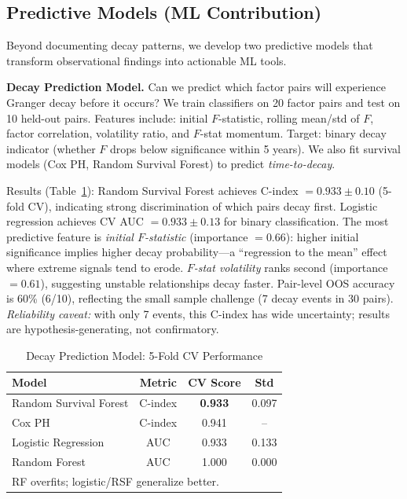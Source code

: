 \documentclass[sigconf,anonymous]{acmart}
\begin{document}
\subsection{Predictive Models (ML Contribution)}
\label{sec:prediction}

Beyond documenting decay patterns, we develop two predictive models
that transform observational findings into actionable ML tools.

\textbf{Decay Prediction Model.}
Can we predict which factor pairs will experience Granger decay before
it occurs? We train classifiers on 20 factor pairs and test on 10
held-out pairs. Features include: initial $F$-statistic, rolling mean/std
of $F$, factor correlation, volatility ratio, and $F$-stat momentum.
Target: binary decay indicator (whether $F$ drops below significance
within 5 years). We also fit survival models (Cox PH, Random Survival Forest)
to predict \emph{time-to-decay}.

Results (Table~\ref{tab:decay_pred}): Random Survival Forest achieves
C-index $= 0.933 \pm 0.10$ (5-fold CV), indicating strong discrimination
of which pairs decay first. Logistic regression achieves CV AUC $= 0.933 \pm 0.13$
for binary classification. The most predictive feature
is \emph{initial $F$-statistic} (importance $= 0.66$): higher initial
significance implies higher decay probability---a ``regression to the mean''
effect where extreme signals tend to erode. \emph{$F$-stat volatility}
ranks second (importance $= 0.61$), suggesting unstable relationships
decay faster. Pair-level OOS accuracy is 60\% (6/10), reflecting the
small sample challenge (7 decay events in 30 pairs).
\emph{Reliability caveat:} with only 7 events, this C-index has wide
uncertainty; results are hypothesis-generating, not confirmatory.

\begin{table}[t]
\centering
\caption{Decay Prediction Model: 5-Fold CV Performance}
\label{tab:decay_pred}
\small
\begin{tabular}{@{}lccc@{}}
\toprule
Model & Metric & CV Score & Std \\
\midrule
Random Survival Forest & C-index & \textbf{0.933} & 0.097 \\
Cox PH & C-index & 0.941 & -- \\
Logistic Regression & AUC & 0.933 & 0.133 \\
Random Forest & AUC & 1.000 & 0.000 \\
\bottomrule
\multicolumn{4}{l}{\footnotesize RF overfits; logistic/RSF generalize better.}
\end{tabular}
\end{table}
\end{document}
